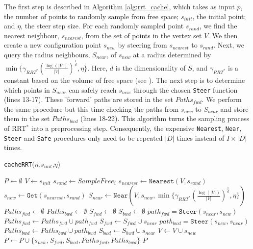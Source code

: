 \documentclass{article}  %
\begin{document}
	The first step is described in Algorithm \ref{alg:rrt_cache}, which takes as input $p$, the number of points to randomly sample from free space; $s_{init}$, the initial point; and $\eta$, the steer step size. For each randomly sampled point $s_{rand}$, we find the nearest neighbour, $s_{nearest}$, from the set of points in the vertex set $V$. We then create a new configuration point $s_{new}$ by steering from $s_{nearest}$ to $s_{rand}$. Next, we query the radius neighbours, $S_{near}$, of $s_{new}$ at a radius determined by  $\min\{\gamma_{RRT^*}(\frac{\log(|V|)}{|V|})^{\frac{1}{d}},\eta\}$. Here, $d$ is the dimensionality of $S$, and $\gamma_{RRT^*}$ is a constant based on the volume of free space (see \cite{karaman2011sampling}). The next step is to determine which points in $S_{near}$ can safely reach $s_{new}$ through the chosen \texttt{Steer} function (lines 13-17). These 'forward' paths are stored in the set $Paths_{fwd}$. We perform the same procedure but this time checking the paths from $s_{new}$ to $S_{near}$ and store them in the set $Paths_{bwd}$ (lines 18-22). This algorithm turns the sampling process of RRT$^*$  into a preprocessing step. Consequently, the expensive \texttt{Nearest}, \texttt{Near}, \texttt{Steer} and \texttt{Safe} procedures only need to be repeated $|D|$ times instead of $I\times|D|$ times.


	\begin{algorithm}

 	\scriptsize
	\caption{\small \texttt{cacheRRT}($n$,$s_{init}$,$\eta$)}
	\label{alg:rrt_cache}
	\begin{algorithmic}[1]
	\STATE $P \gets \emptyset$ \hfill {}
	\STATE $V \gets {s_{init}}$
	\STATE $s_{rand} \gets SampleFree_i$
	\STATE $s_{nearest} \gets \texttt{Nearest}(V,s_{rand})$
	\STATE $s_{new} \gets \texttt{Get}(s_{nearest},s_{rand})$
	\STATE $S_{near} \gets \texttt{Near}(V,{s_{new}},\min\{\gamma_{RRT^*}(\frac{\log(|V|)}{|V|})^{\frac{1}{d}},\eta\})$
	\STATE $Paths_{fwd} \gets \emptyset$
	\STATE $Paths_{bwd} \gets \emptyset$
	\STATE $S_{fwd} \gets \emptyset$
	\STATE $S_{bwd} \gets \emptyset$
	\STATE $path_{fwd} = \texttt{Steer}(s_{near},s_{new})$
	\STATE $Paths_{fwd} \gets Paths_{fwd} \cup path_{fwd}$
	\STATE $S_{fwd} \gets S_{fwd} \cup s_{near}$
	\ENDIF
	\STATE $path_{bwd} = \texttt{Steer}(s_{new},s_{near})$
	\STATE $Paths_{bwd} \gets Paths_{bwd} \cup path_{bwd}$
	\STATE $S_{bwd} \gets S_{bwd} \cup s_{near}$
	\ENDIF
	\ENDFOR
	\STATE $V\gets V \cup s_{new}$
	\STATE $P \gets P \cup \{s_{new},S_{fwd},S_{bwd},Paths_{fwd},Paths_{bwd}\}$
	\ENDFOR
	\RETURN $P$
	\end{algorithmic}

	\end{algorithm}
\end{document}
